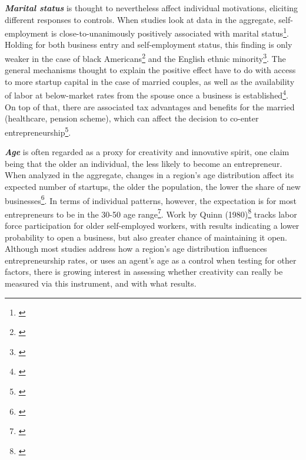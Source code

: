 \textbf{\textit{Marital status}} is thought to nevertheless affect individual motivations, eliciting different responses to controls. When studies look at data in the aggregate, self-employment is close-to-unanimously positively associated with marital status\footnote{\cite[Page~74]{Parker2004}}. Holding for both business entry and self-employment status, this finding is only weaker in the case of black Americans\footnote{\cite{borjas1986self}} and the English ethnic minority\footnote{\cite{clark2000pushed}}. The general mechanisms thought to explain the positive effect have to do with access to more startup capital in the case of married couples, as well as the availability of labor at below-market rates from the spouse once a business is established\footnote{\cite[Page~75]{Parker2004}}. On top of that, there are associated tax advantages and benefits for the married (healthcare, pension scheme), which can affect the decision to co-enter entrepreneurship\footnote{\cite[Page~75]{BlanchflowerOswald1998}}.

\textbf{\textit{Age}} is often regarded as a proxy for creativity and innovative spirit, one claim being that the older an individual, the less likely to become an entrepreneur. When analyzed in the aggregate, changes in a region's age distribution affect its expected number of startups, the older the population, the lower the share of new businesses\footnote{\cite{Bonte2007}}. In terms of individual patterns, however, the expectation is for most entrepreneurs to be in the 30-50 age range\footnote{\cite{LiangWangLazear2014}}. Work by Quinn (1980)\footnote{\cite{Quinn1980}} tracks labor force participation for older self-employed workers, with results indicating a lower probability to open a business, but also greater chance of maintaining it open. Although most studies address how a region's age distribution influences entrepreneurship rates, or uses an agent's age as a control when testing for other factors, there is growing interest in assessing whether creativity can really be measured via this instrument, and with what results.

